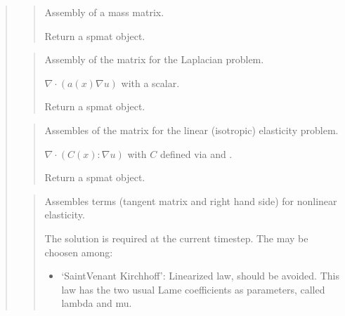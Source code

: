 \documentclass[a4paper,11pt,english]{sphinxmanual}
\begin{document}
\begin{quote}
\sphinxAtStartPar
{}
\begin{quote}

\sphinxAtStartPar
Assembly of a mass matrix.

\sphinxAtStartPar
Return a spmat object.
\end{quote}

\sphinxAtStartPar
{}
\begin{quote}

\sphinxAtStartPar
Assembly of the matrix for the Laplacian problem.

\sphinxAtStartPar
\(\nabla\cdot(a(x)\nabla u)\)  with  a scalar.

\sphinxAtStartPar
Return a spmat object.
\end{quote}

\sphinxAtStartPar
{}
\begin{quote}

\sphinxAtStartPar
Assembles of the matrix for the linear (isotropic) elasticity problem.

\sphinxAtStartPar
\(\nabla\cdot(C(x):\nabla u)\)
with \(C\) defined via  and .

\sphinxAtStartPar
Return a spmat object.
\end{quote}

\sphinxAtStartPar
{}
\begin{quote}

\sphinxAtStartPar
Assembles terms (tangent matrix and right hand side) for nonlinear elasticity.

\sphinxAtStartPar
The solution  is required at the current time\sphinxhyphen{}step. The 
may be choosen among:
\begin{itemize}
\item {} 
\sphinxAtStartPar
‘SaintVenant Kirchhoff’:
Linearized law, should be avoided. This law has the two usual
Lame coefficients as parameters, called lambda and mu.


\end{itemize}
\end{quote}
\end{quote}
\end{document}
